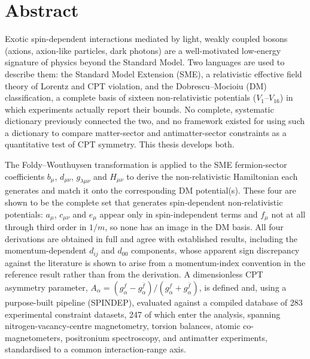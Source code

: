 \chapter*{Abstract}

Exotic spin-dependent interactions mediated by light, weakly coupled bosons
(axions, axion-like particles, dark photons) are a well-motivated
low-energy signature of physics beyond the Standard Model. Two languages
are used to describe them: the Standard Model Extension (SME), a
relativistic effective field theory of Lorentz and CPT violation, and the
Dobrescu--Mocioiu (DM) classification, a complete basis of sixteen
non-relativistic potentials ($V_1$--$V_{16}$) in which experiments actually
report their bounds. No complete, systematic dictionary previously
connected the two, and no framework existed for using such a dictionary to
compare matter-sector and antimatter-sector constraints as a quantitative
test of CPT symmetry. This thesis develops both.

The Foldy--Wouthuysen transformation is applied to the SME fermion-sector
coefficients $b_\mu$, $d_{\mu\nu}$, $g_{\lambda\mu\nu}$ and $H_{\mu\nu}$ to
derive the non-relativistic Hamiltonian each generates and match it onto the
corresponding DM potential(s). These four are shown to be the complete set
that generates spin-dependent non-relativistic potentials: $a_\mu$,
$c_{\mu\nu}$ and $e_\mu$ appear only in spin-independent terms and $f_\mu$
not at all through third order in $1/m$, so none has an image in the DM
basis. All four
derivations are obtained in full and agree with established results,
including the momentum-dependent $d_{ij}$ and $d_{00}$ components, whose
apparent sign discrepancy against the literature is shown to arise from a
momentum-index convention in the reference result rather than from the
derivation. A dimensionless CPT asymmetry parameter, $A_\alpha =
(g_\alpha^{f}-g_\alpha^{\bar f})/(g_\alpha^{f}+g_\alpha^{\bar f})$, is
defined and, using a purpose-built pipeline (SPINDEP), evaluated against a
compiled database of 283 experimental constraint datasets, 247 of which
enter the analysis, spanning
nitrogen-vacancy-centre magnetometry, torsion balances, atomic
co-magnetometers, positronium spectroscopy, and antimatter experiments,
standardised to a common interaction-range axis.

